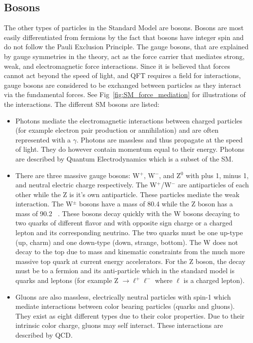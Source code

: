 \subsection{Bosons}
 The other types of particles in the Standard Model are bosons. Bosons are most easily differentiated from fermions by the fact that bosons have integer spin and do not follow the Pauli Exclusion Principle. The gauge bosons, that are explained by gauge symmetries in the theory, act as the force carrier that mediates strong, weak, and electromagnetic force interactions. Since it is believed that forces cannot act beyond the speed of light, and QFT requires a field for interactions, gauge bosons are considered to be exchanged between particles as they interact via the fundamental forces. See Fig~\ref{fig:SM_force_mediation} for illustrations of the interactions. The different SM bosons are listed:
 \begin{itemize}
 \item  Photons mediate the electromagnetic interactions between charged particles (for example electron pair production or annihilation) and are often represented with a $\gamma$. Photons are massless and thus propagate at the speed of light. They do however contain momentum equal to their energy. Photons are described by Quantum Electrodynamics which is a subset of the SM.\\
 \item There are three massive gauge bosons: W$^+$, W$^-$, and Z$^0$ with plus 1, minus 1, and neutral electric charge respectively. The W$^+$/W$^-$ are antiparticles of each other while the Z is it's own antiparticle. These particles mediate the weak interaction. The W$^{\pm}$ bosons have a mass of 80.4 \GeVcc while the Z boson has a mass of 90.2 \GeVcc~\cite{pdg}. These bosons decay quickly with the W bosons decaying to two quarks of different flavor and with opposite sign charge or a charged lepton and its corresponding neutrino. The two quarks must be one up-type (up, charm) and one down-type (down, strange, bottom). The W does not decay to the top due to mass and kinematic constraints from the much more massive top quark at current energy accelerators. For the Z boson, the decay must be to a fermion and its anti-particle which in the standard model is quarks and leptons (for example Z  $\rightarrow \ell^+ \ell^- $ where $\ell$ is a charged lepton).\\
 \item Gluons are also massless, electrically neutral particles with spin-1 which mediate interactions between color bearing particles (quarks and gluons). They exist as eight different types due to their color properties. Due to their intrinsic color charge, gluons may self interact. These interactions are described by QCD.\\
 \end{itemize} 
 
